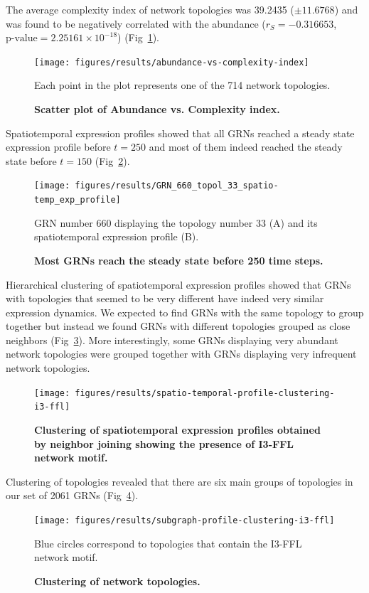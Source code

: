 \documentclass[10pt,letterpaper]{article}
\begin{document}
The average complexity index of network topologies was 39.2435 ($\pm 11.6768$)
and was found to be negatively correlated with the abundance ($r_S = -0.316653$,
$\text{p-value} = 2.25161\times10^{-18}$) (Fig~\ref{fig:ab-comp}).

\begin{figure}[!h]
 \texttt{[image: figures/results/abundance-vs-complexity-index]}
 \caption{\bf Scatter plot of Abundance vs. Complexity index.}
 Each point in the plot represents one of the 714 network topologies.
 \label{fig:ab-comp}
\end{figure}

Spatiotemporal expression profiles showed that all GRNs reached a steady state
expression profile before $t = 250$ and most of them indeed reached the steady
state before $t = 150$ (Fig~\ref{fig:profile}).

\begin{figure}[!h]
 \texttt{[image: figures/results/GRN\_660\_topol\_33\_spatio-temp\_exp\_profile]}
 \caption{\bf Most GRNs reach the steady state before 250 time steps.}
 GRN number 660 displaying the topology number 33 (A) and its spatiotemporal
 expression profile (B).
 \label{fig:profile}
\end{figure}

Hierarchical clustering of spatiotemporal expression profiles showed that GRNs
with topologies that seemed to be very different have indeed very similar
expression dynamics. We expected to find GRNs with the same topology to group
together but instead we found GRNs with different topologies grouped as close
neighbors (Fig~\ref{fig:exp-tree}). More interestingly, some GRNs displaying 
very abundant network topologies were grouped together with GRNs displaying 
very infrequent network topologies.

\begin{figure}[!h]
 \texttt{[image: figures/results/spatio-temporal-profile-clustering-i3-ffl]}
 \caption{\bf Clustering of spatiotemporal expression profiles obtained by
 neighbor joining showing the presence of I3-FFL network motif.}
 \label{fig:exp-tree}
\end{figure}

Clustering of topologies revealed that there are six main groups of topologies
in our set of 2061 GRNs (Fig~\ref{fig:subg-tree}).

\begin{figure}[!h]
 \texttt{[image: figures/results/subgraph-profile-clustering-i3-ffl]}
 \caption{\bf Clustering of network topologies.}
 Blue circles correspond to topologies that contain the I3-FFL network motif.
 \label{fig:subg-tree}
\end{figure}
\end{document}
